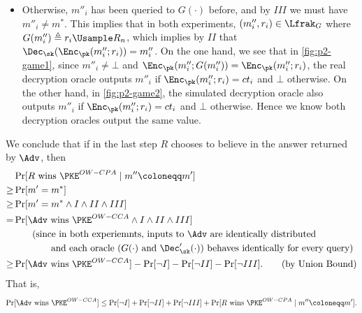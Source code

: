 \begin{answer}[i]
\begin{enumerate}
\begin{itemize}
            \item Otherwise, $m''_i$ has been queried to $G(\cdot)$ before, and by $III$ we must have $m''_i\neq m^\ast$.
            This implies that in both experiments,  $(m''_i, r_i)\in\Lfrak_G$ where $G(m''_i)\triangleq r_i\Usample R_n$, which implies by $II$ that $\Dec_\sk(\Enc_\pk(m''_i; r_i))= m''_i$.
            On the one hand, we see that in \autoref{fig:p2-game1}, since $m''_i\neq \bot$ and $\Enc_\pk(m''_i; G(m''_i))=\Enc_\pk(m''_i; r_i)$, the real decryption oracle outputs $m''_i$ if $\Enc_\pk(m''_i; r_i)=ct_i$ and $\bot$ otherwise. 
            On the other hand, in \autoref{fig:p2-game2}, the simulated decryption oracle also outputs $m''_i$ if $\Enc_\pk(m''_i; r_i)=ct_i$ and $\bot$ otherwise.
            Hence we know both decryption oracles output the same value.
        \end{itemize}
        We conclude that if in the last step $R$ chooses to believe in the answer returned by $\Adv$, then
        \begin{align*}
            &\Pr[R \textrm{ wins } \PKE^{OW-CPA} \mid m''\coloneqq m']\\
            \ge& \Pr[m'=m^\ast]\\
            \ge& \Pr[m'=m^\ast \land I \land II\land III]\\
            =& \Pr[\Adv \textrm{ wins } \PKE^{OW-CCA} \land I \land II\land III]\\
            &\qquad (\textrm{since in both experiemnts, inputs to } \Adv \textrm{ are identically distributed}\\
            &\qquad\qquad \textrm{and each oracle ($G(\cdot)$ and $\Dec'_\sk(\cdot)$) behaves identically for every query})\\
            \ge& \Pr[\Adv \textrm{ wins } \PKE^{OW-CCA}] - \Pr[\neg I] - \Pr[\neg II]- \Pr[\neg III].
            \qquad (\textrm{by Union Bound})
        \end{align*} That is,
        \begin{equation}\label{eq:p2-1-1}
            \Pr[\Adv \textrm{ wins } \PKE^{OW-CCA}] \le 
            \Pr[\neg I] + \Pr[\neg II]+ \Pr[\neg III] +\Pr[R \textrm{ wins } \PKE^{OW-CPA} \mid m''\coloneqq m'].
        \end{equation}
        

\end{enumerate}
\end{answer}
